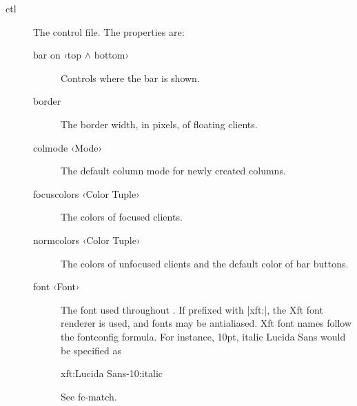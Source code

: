 \begin{description}
  \item[ctl] The control file. The properties are:
    \begin{description}
      \item[bar on ‹top $\wedge$ bottom›] Controls where the bar
        is shown.
      \item[border] The border width, in pixels, of floating
        clients.
      \item[colmode ‹Mode›] The default column mode for newly
        created columns.
      \item[focuscolors ‹Color Tuple›] The colors of focused
        clients.
      \item[normcolors ‹Color Tuple›] The colors of unfocused
        clients and the default color of bar buttons.
      \item[font ‹Font›] The font used throughout \wmii. If
        prefixed with |xft:|, the Xft font renderer is used, and
        fonts may be antialiased. Xft font names follow the
        fontconfig formula. For instance, 10pt, italic Lucida
        Sans would be specified as

        \begin{code}
          xft:Lucida Sans-10:italic
        \end{code}

        See  {fc-match}.


\end{description}
\end{description}
